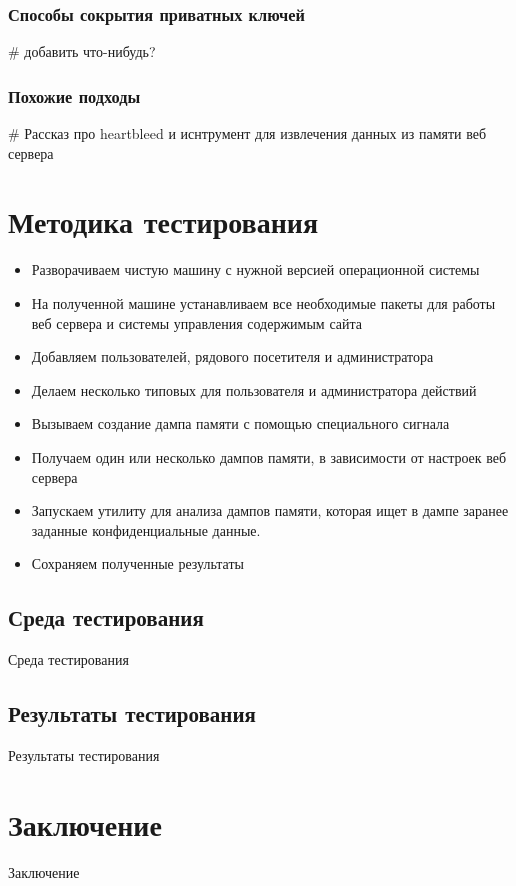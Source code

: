 \documentclass[20pt]{article}
\begin{document}
\subsubsection{Способы сокрытия приватных ключей}
\# добавить что-нибудь?

\subsubsection{Похожие подходы}
\# Рассказ про heartbleed и иснтрумент для извлечения данных из памяти веб сервера

\newpage

\section{Методика тестирования}
\begin{itemize}
  \item Разворачиваем чистую машину с нужной версией операционной системы
  \item На полученной машине устанавливаем все необходимые пакеты для работы
  веб сервера и системы управления содержимым сайта
  \item Добавляем пользователей, рядового посетителя и администратора
  \item Делаем несколько типовых для пользователя и администратора действий
  \item Вызываем создание дампа памяти с помощью специального сигнала
  \item Получаем один или несколько дампов памяти, в зависимости от настроек
  веб сервера
  \item Запускаем утилиту для анализа дампов памяти, которая ищет в дампе
  заранее заданные конфиденциальные данные.
  \item Сохраняем полученные результаты
\end{itemize}


\subsection{Среда тестирования}
Среда тестирования

\subsection{Результаты тестирования}
Результаты тестирования

\newpage

\section{Заключение}
Заключение



\end{document}
